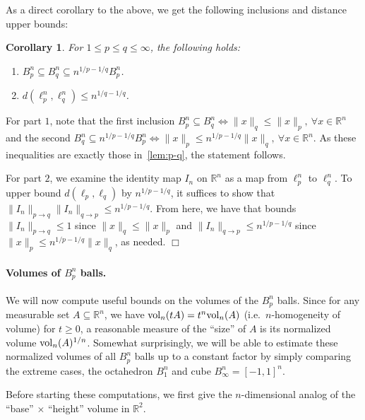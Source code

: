 \documentclass[11pt]{article}
\newtheorem{corollary}[theorem]{Corollary}
\theoremstyle{plain}
\newenvironment{proof}{\noindent {\sc Proof:}}{$\Box$ \medskip}
\theoremstyle{plain}
\newcommand{\R}{\ensuremath{\mathbb{R}}}
\newcommand{\vol}{{\rm vol}}
\begin{document}
As a direct corollary to the above, we get the following inclusions and distance
upper bounds:

\begin{corollary} For $1 \leq p \leq q \leq \infty$, the following holds:
\begin{enumerate}
\item $B_p^n \subseteq B_q^n \subseteq n^{1/p-1/q} B_p^n$.
\item $d(\ell_p^n,\ell_q^n) \leq n^{1/q-1/q}$.
\end{enumerate}
\label{cor:p-q}
\end{corollary}
\begin{proof}
For part $1$, note that the first inclusion $B_p^n \subseteq B_q^n
\Leftrightarrow \|x\|_q \leq \|x\|_p,~\forall x \in \R^n$ and the second $B_q^n
\subseteq n^{1/p-1/q} B_p^n \Leftrightarrow \|x\|_p \leq n^{1/p-1/q}
\|x\|_q,~\forall x \in \R^n$. As these inequalities are exactly those
in~\ref{lem:p-q}, the statement follows.

For part $2$, we examine the identity map $I_n$ on $\R^n$ as a map from
$\ell_p^n$ to $\ell_q^n$. To upper bound $d(\ell_p,\ell_q)$ by $n^{1/p-1/q}$, it
suffices to show that $\|I_n\|_{p \rightarrow q} \|I_n\|_{q \rightarrow p} \leq
n^{1/p-1/q}$. From here, we have that bounds $\|I_n\|_{p \rightarrow q} \leq 1$
since $\|x\|_q \leq \|x\|_p$ and $\|I_n\|_{q \rightarrow p} \leq n^{1/p-1/q}$
since $\|x\|_p \leq n^{1/p-1/q} \|x\|_q$, as needed. 
\end{proof}

\paragraph{\bf Volumes of $B_p^n$ balls.} We will now compute useful bounds on
the volumes of the $B_p^n$ balls.  Since for any measurable set $A \subseteq
\R^n$, we have $\vol_n(t A) = t^n \vol_n(A)$ (i.e.~$n$-homogeneity of volume)
for $t \geq 0$, a reasonable measure of the ``size'' of $A$ is its normalized
volume $\vol_n(A)^{1/n}$. Somewhat surprisingly, we will be able to estimate
these normalized volumes of all $B_p^n$ balls up to a constant factor by simply
comparing the extreme cases, the octahedron $B_1^n$ and cube $B_\infty^n =
[-1,1]^n$.

Before starting these computations, we first give the $n$-dimensional analog of
the ``base'' $\times$ ``height'' volume in $\R^2$.
\end{document}
